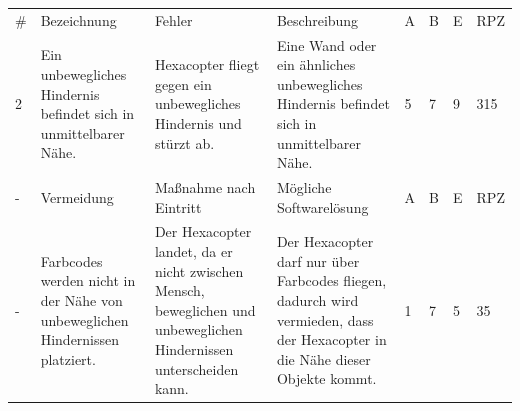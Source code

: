 \begin{longtable}{|p{0.4cm}|p{3.0cm}|p{3.1cm}|p{3.1cm}|p{0.4cm}|p{0.4cm}|p{0.4cm}|p{0.8cm}|}
\hline \#   & Bezeichnung                                                                                               & Fehler                                                                                                                & Beschreibung                                                                                                                    & A   & B   & E   & RPZ \\
 2          & Ein unbewegliches Hindernis befindet sich in unmittelbarer Nähe.                                          & Hexacopter fliegt gegen ein unbewegliches Hindernis und stürzt ab.                                                    & Eine Wand oder ein ähnliches unbewegliches Hindernis befindet sich in unmittelbarer Nähe.                                       & 5   & 7   & 9   & 315 \\
\hline -    & Vermeidung                                                                                                & Maßnahme nach Eintritt                                                                                                & Mögliche Softwarelösung                                                                                                         & A   & B   & E   & RPZ \\
 -          & Farbcodes werden nicht in der Nähe von unbeweglichen Hindernissen platziert.                              & Der Hexacopter landet, da er nicht zwischen Mensch, beweglichen und unbeweglichen Hindernissen unterscheiden kann.    & Der Hexacopter darf nur über Farbcodes fliegen, dadurch wird vermieden, dass der Hexacopter in die Nähe dieser Objekte kommt.   & 1   & 7   & 5   & 35  \\\hline


\end{longtable}
